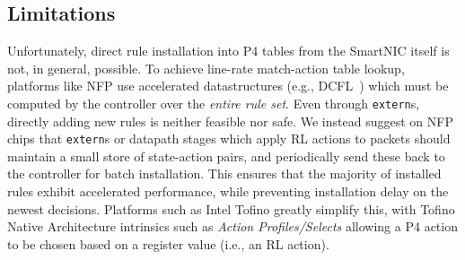 %

%
%
%

\subsection{Limitations}\label{sec:limitations}
Unfortunately, direct rule installation into P4 tables from the SmartNIC itself is not, in general, possible.
To achieve line-rate match-action table lookup, platforms like NFP use accelerated datastructures (e.g., DCFL~\parencite{DBLP:conf/infocom/TaylorT05}) which must be computed by the controller over the \emph{entire rule set}.
Even through \texttt{extern}s, directly adding new rules is neither feasible nor safe.
We instead suggest on NFP chips that \texttt{extern}s or datapath stages which apply RL actions to packets should maintain a small store of state-action pairs, and periodically send these back to the controller for batch installation.
This ensures that the majority of installed rules exhibit accelerated performance, while preventing installation delay on the newest decisions.
Platforms such as Intel Tofino greatly simplify this, with Tofino Native Architecture intrinsics such as \emph{Action Profiles/Selects} allowing a P4 action to be chosen based on a register value (i.e., an RL action).

